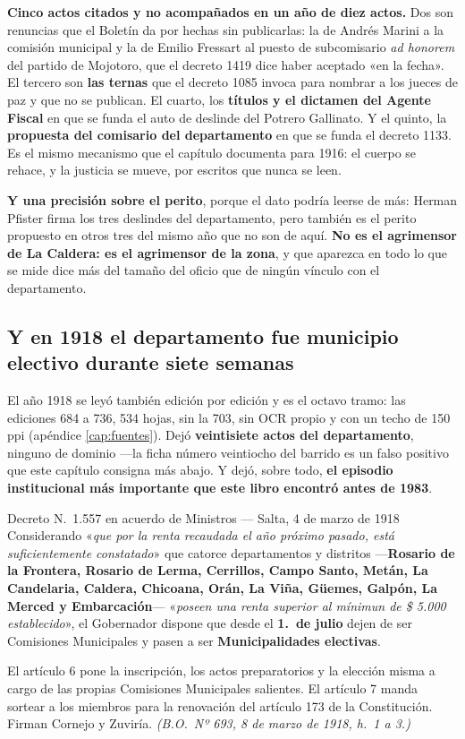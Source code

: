 \begin{cautela}
\textbf{Cinco actos citados y no acompañados en un año de diez actos.} Dos son renuncias que el Boletín da por hechas sin publicarlas: la de Andrés Marini a la comisión municipal y la de Emilio Fressart al puesto de subcomisario \textit{ad honorem} del partido de Mojotoro, que el decreto 1419 dice haber aceptado «en la fecha». El tercero son \textbf{las ternas} que el decreto 1085 invoca para nombrar a los jueces de paz y que no se publican. El cuarto, los \textbf{títulos y el dictamen del Agente Fiscal} en que se funda el auto de deslinde del Potrero Gallinato. Y el quinto, la \textbf{propuesta del comisario del departamento} en que se funda el decreto 1133. Es el mismo mecanismo que el capítulo documenta para 1916: el cuerpo se rehace, y la justicia se mueve, por escritos que nunca se leen.

\textbf{Y una precisión sobre el perito}, porque el dato podría leerse de más: Herman Pfister firma los tres deslindes del departamento, pero también es el perito propuesto en otros tres del mismo año que no son de aquí. \textbf{No es el agrimensor de La Caldera: es el agrimensor de la zona}, y que aparezca en todo lo que se mide dice más del tamaño del oficio que de ningún vínculo con el departamento.
\end{cautela}

\subsection*{Y en 1918 el departamento fue municipio electivo durante siete semanas}

El año 1918 se leyó también edición por edición y es el octavo tramo: las ediciones 684 a 736,
534 hojas, sin la 703, sin OCR propio y con un techo de 150 ppi (apéndice \ref{cap:fuentes}).
Dejó \textbf{veintisiete actos del departamento}, ninguno de dominio ---la ficha número
veintiocho del barrido es un falso positivo que este capítulo consigna más abajo. Y dejó, sobre todo, \textbf{el
episodio institucional más importante que este libro encontró antes de 1983}.

\begin{ficha}{Decreto N.\ 1.557 en acuerdo de Ministros --- Salta, 4 de marzo de 1918}
Considerando «\textit{que por la renta recaudada el año próximo pasado, está suficientemente
constatado}» que catorce departamentos y distritos ---\textbf{Rosario de la Frontera, Rosario de
Lerma, Cerrillos, Campo Santo, Metán, La Candelaria, Caldera, Chicoana, Orán, La Viña, Güemes,
Galpón, La Merced y Embarcación}--- «\textit{poseen una renta superior al mínimun de \$ 5.000
establecido}», el Gobernador dispone que desde el \textbf{1.\ de julio} dejen de ser Comisiones
Municipales y pasen a ser \textbf{Municipalidades electivas}.

El artículo 6 pone la inscripción, los actos preparatorios y la elección misma a cargo de las
propias Comisiones Municipales salientes. El artículo 7 manda sortear a los miembros para la
renovación del artículo 173 de la Constitución. Firman Cornejo y Zuviría.
\textit{(B.O.\ Nº 693, 8 de marzo de 1918, h.\ 1 a 3.)}
\end{ficha}

